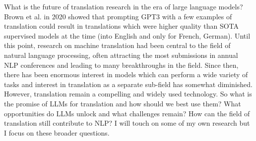 What is the future of translation research in the era of large language models? Brown et al. in 2020 showed that prompting GPT3 with a few examples of translation could result in translations which were higher quality than SOTA supervised models at the time (into English and only for French, German). Until this point, research on machine translation had been central to the field of natural language processing, often attracting the most submissions in annual NLP conferences and leading to many breakthroughs in the field. Since then, there has been enormous interest in models which can perform a wide variety of tasks and interest in translation as a separate sub-field has somewhat diminished. However, translation remain a compelling and widely used technology. So what is the promise of LLMs for translation and how should we best use them? What opportunities do LLMs unlock and what challenges remain? How can the field of translation still contribute to NLP? I will touch on some of my own research but I focus on these broader questions.
